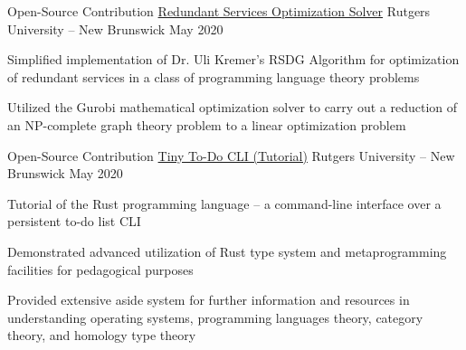 \usepackage{hyperref}


\begin{cventries}
  \cventry
  {Open-Source Contribution}
  {\href{https://github.com/hariamoor/lp_generator}{Redundant Services Optimization Solver}}
  {Rutgers University -- New Brunswick}
  {May 2020}
  {
    \begin{cvitems}
    \item {Simplified implementation of Dr. Uli Kremer's RSDG Algorithm for optimization of redundant services in a class of programming language theory problems}
    \item {Utilized the Gurobi mathematical optimization solver to carry out a reduction of an NP-complete graph theory problem to a linear optimization problem}
    \end{cvitems}
  }

  \cventry
  {Open-Source Contribution}
  {\href{https://github.com/hariamoor/todo-cli}{Tiny To-Do CLI (Tutorial)}}
  {Rutgers University -- New Brunswick}
  {May 2020}
  {
    \begin{cvitems}
    \item {Tutorial of the Rust programming language -- a command-line interface over a persistent to-do list CLI}
    \item {Demonstrated advanced utilization of Rust type system and metaprogramming facilities for pedagogical purposes}
    \item {Provided extensive aside system for further information and resources in understanding operating systems, programming languages theory, category theory, and homology type theory}
    \end{cvitems}
  }
\end{cventries}
